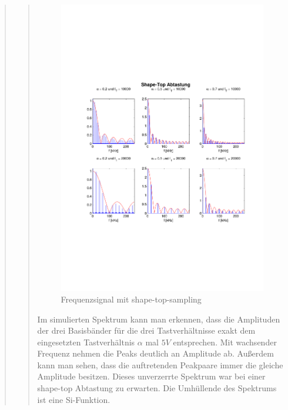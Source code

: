 \begin{quote}
\begin{quote}
  	    \begin{figure}[H]
    \centering
        \includegraphics[scale=0.6, trim = 1.5cm 6cm 1cm 8cm,
        clip]{./Bilder/shae-top-freq_5V}
            \caption{Frequenzsignal mit shape-top-sampling}
  	    \end{figure}


  	    Im simulierten Spektrum kann man erkennen, dass die Amplituden der
  	    drei Basisbänder für die drei Tastverhältnisse exakt dem eingesetzten
  	    Tastverhältnis $\alpha$ mal $5V$ entsprechen. Mit wachsender Frequenz
  	    nehmen die Peaks deutlich an Amplitude ab. Außerdem kann man sehen, dass
  	    die auftretenden Peakpaare immer die gleiche Amplitude besitzen. Dieses
  	    unverzerrte Spektrum war bei einer shape-top Abtastung zu erwarten.
  	    Die Umhüllende des Spektrums ist eine Si-Funktion.
  	    \vspace{1em}
  	    

\end{quote}
\end{quote}
